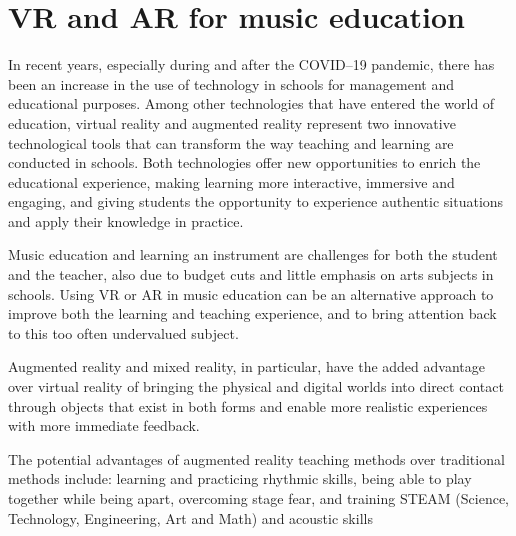 \section{VR and AR for music education}\label{sec:vr-in-education}
In recent years, especially during and after the COVID--19 pandemic,
there has been an increase in the use of technology in schools for management and educational purposes.
Among other technologies that have entered the world of education, virtual reality and augmented reality represent
two innovative technological tools that can transform the way teaching and learning are conducted in schools.
Both technologies offer new opportunities to enrich the educational experience,
making learning more interactive, immersive and engaging,
and giving students the opportunity to experience authentic situations and apply their knowledge in practice.

Music education and learning an instrument are challenges for both the student and the teacher,
also due to budget cuts and little emphasis on arts subjects in schools.
Using VR or AR in music education can be an alternative approach to improve both the learning and teaching experience,
and to bring attention back to this too often undervalued subject.

Augmented reality and mixed reality, in particular, have the added advantage over virtual reality of bringing
the physical and digital worlds into direct contact through objects that exist
in both forms and enable more realistic experiences with more immediate feedback.

The potential advantages of augmented reality teaching methods over traditional methods include:
learning and practicing rhythmic skills, being able to play together while being apart, overcoming stage fear, and 
training STEAM (Science, Technology, Engineering, Art and Math) and acoustic skills~\cite{vr-and-ar-in-music-education}
